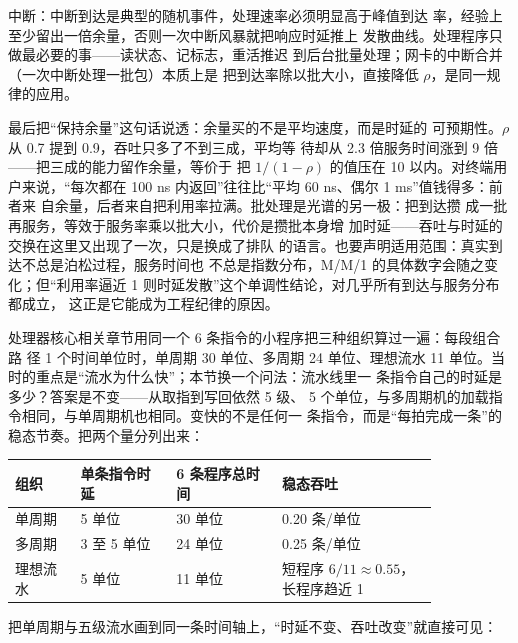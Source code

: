 中断：中断到达是典型的随机事件，处理速率必须明显高于峰值到达
率，经验上至少留出一倍余量，否则一次中断风暴就把响应时延推上
发散曲线。处理程序只做最必要的事——读状态、记标志，重活推迟
到后台批量处理；网卡的中断合并（一次中断处理一批包）本质上是
把到达率除以批大小，直接降低 $\rho$，是同一规律的应用。

最后把“保持余量”这句话说透：余量买的不是平均速度，而是时延的
可预期性。$\rho$ 从 0.7 提到 0.9，吞吐只多了不到三成，平均等
待却从 2.3 倍服务时间涨到 9 倍——把三成的能力留作余量，等价于
把 $1/(1-\rho)$ 的值压在 10 以内。对终端用户来说，“每次都在
100 ns 内返回”往往比“平均 60 ns、偶尔 1 ms”值钱得多：前者来
自余量，后者来自把利用率拉满。批处理是光谱的另一极：把到达攒
成一批再服务，等效于服务率乘以批大小，代价是攒批本身增
加时延——吞吐与时延的交换在这里又出现了一次，只是换成了排队
的语言。也要声明适用范围：真实到达不总是泊松过程，服务时间也
不总是指数分布，M/M/1 的具体数字会随之变化；但“利用率逼近 1
则时延发散”这个单调性结论，对几乎所有到达与服务分布都成立，
这正是它能成为工程纪律的原因。

处理器核心相关章节用同一个 6 条指令的小程序把三种组织算过一遍：每段组合路
径 1 个时间单位时，单周期 30 单位、多周期 24 单位、理想流水 11
单位。当时的重点是“流水为什么快”；本节换一个问法：流水线里一
条指令自己的时延是多少？答案是不变——从取指到写回依然 5 级、
5 个单位，与多周期机的加载指令相同，与单周期机也相同。变快的不是任何一
条指令，而是“每拍完成一条”的稳态节奏。把两个量分列出来：

\begin{longtable}{L{0.13\linewidth}L{0.19\linewidth}L{0.21\linewidth}L{0.31\linewidth}}
\toprule
组织 & 单条指令时延 & 6 条程序总时间 & 稳态吞吐 \\
\midrule
单周期 & 5 单位 & 30 单位 & 0.20 条/单位 \\\tablerowrule
多周期 & 3 至 5 单位 & 24 单位 & 0.25 条/单位 \\\tablerowrule
理想流水 & 5 单位 & 11 单位 & 短程序 $6/11\approx0.55$，长程序趋近 1 \\
\bottomrule
\end{longtable}

把单周期与五级流水画到同一条时间轴上，“时延不变、吞吐改变”就直接可见：

